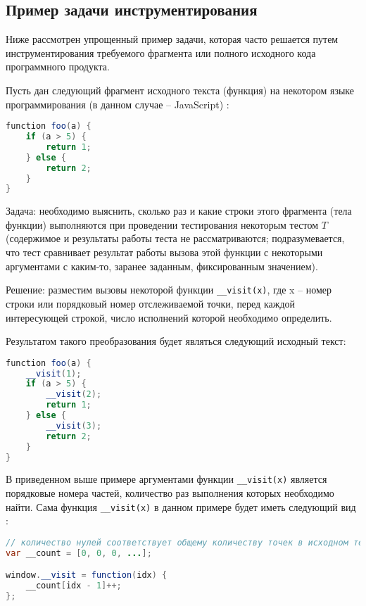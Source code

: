 \subsection{Пример задачи инструментирования}
Ниже рассмотрен упрощенный пример задачи, которая часто решается путем инструментирования требуемого фрагмента или полного исходного кода программного продукта.

Пусть дан следующий фрагмент исходного текста (функция) на некотором языке программирования (в данном случае -- JavaScript) \cite{instrumentiruieto}:
\begin{lstlisting}[frame=single, language=Java]
function foo(a) {
    if (a > 5) {
        return 1;
    } else {
        return 2;
    }
}
\end{lstlisting}

Задача: необходимо выяснить, сколько раз и какие строки этого фрагмента (тела функции) выполняются при проведении тестирования некоторым тестом $T$ (содержимое и результаты работы теста не рассматриваются; подразумевается, что тест сравнивает результат работы вызова этой функции с некоторыми аргументами с каким-то, заранее заданным, фиксированным значением).

Решение: разместим вызовы некоторой функции \lstinline{__visit(x)}, где x -- номер строки или порядковый номер отслеживаемой точки, перед каждой интересующей строкой, число исполнений которой необходимо определить.

Результатом такого преобразования будет являться следующий исходный текст:
\begin{lstlisting}[frame=single, language=Java]
function foo(a) {
    __visit(1);
    if (a > 5) {
        __visit(2);
        return 1;
    } else {
        __visit(3);
        return 2;
    }
}
\end{lstlisting}

В приведенном выше примере аргументами функции \lstinline{__visit(x)} является порядковые номера частей, количество раз выполнения которых необходимо найти.
Сама функция \lstinline{__visit(x)} в данном примере будет иметь следующий вид \cite{instrumentiruieto}:
\begin{lstlisting}[frame=single, language=Java]
// количество нулей соответствует общему количеству точек в исходном тексте, число исполнений которых необходимо измерить
var __count = [0, 0, 0, ...];

window.__visit = function(idx) {
    __count[idx - 1]++;
};
\end{lstlisting}

